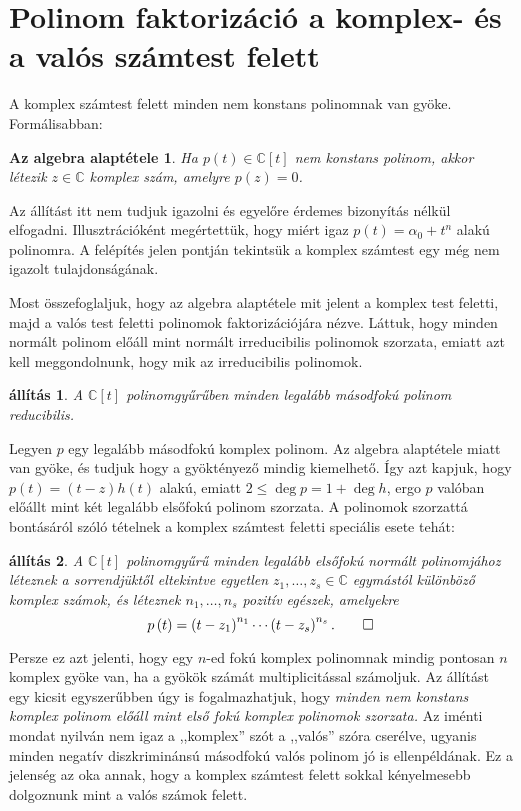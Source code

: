 \documentclass[9pt, showtrims]{memoir}
\makeatletter
\renewenvironment{proof}[1][\proofname]
    {\par\pushQED{\qed}%
    \normalfont \topsep6\p@\@plus6\p@\relax
    \trivlist
    \item[\hskip\labelsep
        \itshape
    #1\@addpunct{:}]\ignorespaces}
    {\popQED\endtrivlist\@endpefalse}
\theoremstyle{plain}
\newtheorem{proposition}{állítás}[section]
\newtheorem*{FA}{Az algebra alaptétele}
\theoremstyle{remark}
\theoremstyle{definition}
\makeatother
\begin{document}
\section{Polinom faktorizáció a komplex- és a valós számtest felett}
A komplex számtest felett minden nem konstans polinomnak van gyöke.
Formálisabban:
\begin{FA}
    Ha $p\left( t \right)\in\mathbb{C}[t]$ nem konstans polinom,
    akkor létezik $z\in\mathbb{C}$ komplex szám, 
    amelyre $p\left( z \right)=0$.
\end{FA}
Az állítást itt nem tudjuk igazolni és egyelőre érdemes bizonyítás nélkül elfogadni.
Illusztrációként megértettük, hogy miért igaz $p\left( t \right)=\alpha_0+t^n$ alakú polinomra.
A felépítés jelen pontján tekintsük a komplex számtest egy még nem igazolt tulajdonságának.

Most összefoglaljuk, hogy az algebra alaptétele mit jelent a komplex test feletti, majd a valós test feletti polinomok
faktorizációjára nézve.
Láttuk, hogy minden normált polinom előáll mint normált irreducibilis polinomok szorzata,
emiatt azt kell meggondolnunk, hogy mik az irreducibilis polinomok.
\begin{proposition}
    A $\mathbb{C}\left[ t \right]$ polinomgyűrűben minden legalább másodfokú polinom reducibilis.
\end{proposition}
\begin{proof}
    Legyen $p$ egy legalább másodfokú komplex polinom.
    Az algebra alaptétele miatt van gyöke, és
    tudjuk hogy a gyöktényező mindig kiemelhető.
    Így azt kapjuk, hogy $p(t)=\left( t-z \right)h\left( t \right)$ alakú,
    emiatt $2\leq\deg p=1+\deg h$, ergo
    $p$ valóban előállt mint két legalább elsőfokú polinom szorzata.
\end{proof}
A polinomok szorzattá bontásáról szóló tételnek a komplex számtest feletti speciális esete tehát:
\begin{proposition}\label{pr:PolFact}
    A $\mathbb{C}[t]$ polinomgyűrű minden legalább elsőfokú normált polinomjához léteznek
    a sorrendjüktől eltekintve egyetlen $z_1,\dots,z_s\in\mathbb{C}$ egymástól különböző komplex számok,
    és léteznek $n_1,\dots,n_s$ pozitív egészek, 
    amelyekre
    \[
        p\left( t \right)=
        \left( t-z_1 \right)^{n_1}
        \cdots
        \left( t-z_s\right)^{n_s}.\qedhere
    \]
\end{proposition}
Persze ez azt jelenti, hogy egy $n$-ed fokú komplex polinomnak mindig pontosan $n$ komplex gyöke van, 
ha a gyökök számát multiplicitással számoljuk.
Az állítást egy kicsit egyszerűbben úgy is fogalmazhatjuk, 
hogy 
\emph{
    minden nem konstans komplex polinom előáll mint első fokú komplex polinomok szorzata.
}
Az iménti mondat nyilván nem igaz a ,,komplex'' szót a ,,valós'' szóra cserélve, 
ugyanis minden negatív diszkriminánsú másodfokú valós polinom jó is ellenpéldának.
Ez a jelenség az oka annak, 
hogy a komplex számtest felett sokkal kényelmesebb dolgoznunk mint a valós számok felett.
\end{document}
